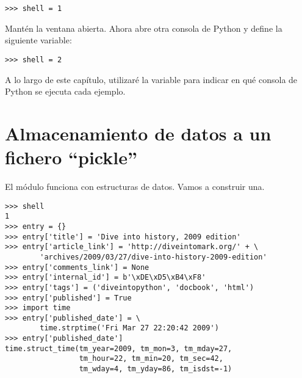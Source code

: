 \noindent\begin{minipage}{\textwidth}
\begin{lstlisting}[mathescape=True]
>>> shell = 1
\end{lstlisting}
\end{minipage}

Mantén la ventana abierta. Ahora abre otra consola de Python y define la siguiente variable:

\noindent\begin{minipage}{\textwidth}
\begin{lstlisting}[mathescape=True]
>>> shell = 2
\end{lstlisting}
\end{minipage}

A lo largo de este capítulo, utilizaré la variable  para indicar en qué consola de Python se ejecuta cada ejemplo.

\section{Almacenamiento de datos a un fichero ``pickle''}

El módulo  funciona con estructuras de datos. Vamos a construir una.

\noindent\begin{minipage}{\textwidth}
\begin{lstlisting}[mathescape=True]
>>> shell
1
>>> entry = {}
>>> entry['title'] = 'Dive into history, 2009 edition'
>>> entry['article_link'] = 'http://diveintomark.org/' + \
        'archives/2009/03/27/dive-into-history-2009-edition'
>>> entry['comments_link'] = None
>>> entry['internal_id'] = b'\xDE\xD5\xB4\xF8'
>>> entry['tags'] = ('diveintopython', 'docbook', 'html')
>>> entry['published'] = True
>>> import time
>>> entry['published_date'] = \
        time.strptime('Fri Mar 27 22:20:42 2009')
>>> entry['published_date']
time.struct_time(tm_year=2009, tm_mon=3, tm_mday=27, 
                 tm_hour=22, tm_min=20, tm_sec=42, 
                 tm_wday=4, tm_yday=86, tm_isdst=-1)
\end{lstlisting}
\end{minipage}

